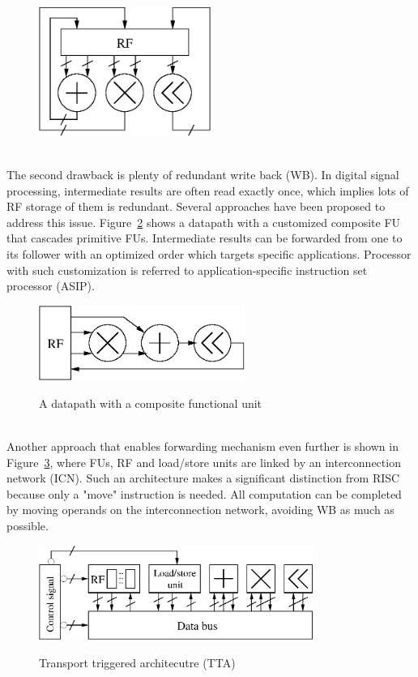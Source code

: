 \documentclass[12pt]{article}
\begin{document}
\begin{CJK}{UTF8}{bkai}
\begin{figure}[!ht]
            \includegraphics[width=0.5\textwidth]{./figs/vliw.eps}
            \label{fig:vliw}
        \end{figure}
        \\
        The second drawback is plenty of redundant write back (WB). 
        In digital signal processing, intermediate results are often read exactly once, which implies lots of RF storage of them is redundant.
        Several approaches have been proposed to address this issue.
        Figure~\ref{fig:cascade} shows a datapath with a customized composite FU that cascades primitive FUs. 
        Intermediate results can be forwarded from one to its follower with an optimized order which targets specific applications.
        Processor with such customization is referred to application-specific instruction set processor (ASIP).
        \begin{figure}[!ht] 
            \caption{A datapath with a composite functional unit}
            \centering
            \includegraphics[width=0.6\textwidth]{./figs/cascade.eps}
            \label{fig:cascade}
        \end{figure}
        \\
        Another approach that enables forwarding mechanism even further is shown in Figure~\ref{fig:tta}, where FUs, RF and load/store units are linked by an interconnection network (ICN).
        Such an architecture makes a significant distinction from RISC because only a "move" instruction is needed. 
        All computation can be completed by moving operands on the interconnection network, avoiding WB as much as possible.

        \begin{figure}[!ht] 
            \caption{Transport triggered architecutre (TTA)}
            \centering
            \includegraphics[width=0.8\textwidth]{./figs/tta.eps}
            \label{fig:tta}
        \end{figure}
      

\end{CJK}
\end{document}

